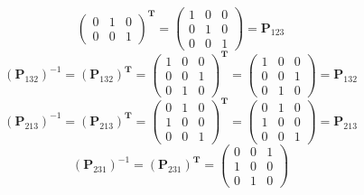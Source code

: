 \documentclass[oneside]{book}
\begin{document}
{{\[\begin{pmatrix}
                    0 & 1 & 0\\
                    0 & 0 & 1
                \end{pmatrix}^{\mathbf{T}}
                =
                \begin{pmatrix}
                    1 & 0 & 0\\
                    0 & 1 & 0\\
                    0 & 0 & 1
                \end{pmatrix}
                =
                \mathbf{P}_{123}
        \]
        \[
            (\mathbf{P}_{132})^{-1}=
                (\mathbf{P}_{132})^{\mathbf{T}}
                =
                \begin{pmatrix}
                    1 & 0 & 0\\
                    0 & 0 & 1\\
                    0 & 1 & 0
                \end{pmatrix}^{\mathbf{T}}
                =
                \begin{pmatrix}
                    1 & 0 & 0\\
                    0 & 0 & 1\\
                    0 & 1 & 0
                \end{pmatrix}
                =
                \mathbf{P}_{132}
        \]
        \[
            (\mathbf{P}_{213})^{-1}=
                (\mathbf{P}_{213})^{\mathbf{T}}
                =
                \begin{pmatrix}
                    0 & 1 & 0\\
                    1 & 0 & 0\\
                    0 & 0 & 1
                \end{pmatrix}^{\mathbf{T}}
                =
                \begin{pmatrix}
                    0 & 1 & 0\\
                    1 & 0 & 0\\
                    0 & 0 & 1
                \end{pmatrix}
                =
                \mathbf{P}_{213}
        \]
        \[
            (\mathbf{P}_{231})^{-1}=
                (\mathbf{P}_{231})^{\mathbf{T}}
                =
                \begin{pmatrix}
                    0 & 0 & 1\\
                    1 & 0 & 0\\
                    0 & 1 & 0

\end{pmatrix}\]}}
\end{document}
